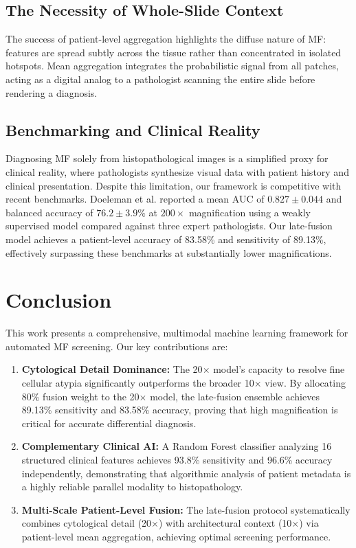 \documentclass[conference]{IEEEtran}
\begin{document}
\subsection{The Necessity of Whole-Slide Context}
The success of patient-level aggregation highlights the diffuse nature of MF: features are spread subtly across the tissue rather than concentrated in isolated hotspots. Mean aggregation integrates the probabilistic signal from all patches, acting as a digital analog to a pathologist scanning the entire slide before rendering a diagnosis.

\subsection{Benchmarking and Clinical Reality}
Diagnosing MF solely from histopathological images is a simplified proxy for clinical reality, where pathologists synthesize visual data with patient history and clinical presentation. Despite this limitation, our framework is competitive with recent benchmarks. Doeleman et al. \cite{Doeleman2024-MF} reported a mean AUC of $0.827 \pm 0.044$ and balanced accuracy of $76.2 \pm 3.9\%$ at $200\times$ magnification using a weakly supervised model compared against three expert pathologists. Our late-fusion model achieves a patient-level accuracy of 83.58\% and sensitivity of 89.13\%, effectively surpassing these benchmarks at substantially lower magnifications.
\section{Conclusion}
This work presents a comprehensive, multimodal machine learning framework for automated MF screening. Our key contributions are:
\begin{enumerate}
    \item \textbf{Cytological Detail Dominance:} The 20$\times$ model's capacity to resolve fine cellular atypia significantly outperforms the broader 10$\times$ view. By allocating 80\% fusion weight to the 20$\times$ model, the late-fusion ensemble achieves 89.13\% sensitivity and 83.58\% accuracy, proving that high magnification is critical for accurate differential diagnosis.
    \item \textbf{Complementary Clinical AI:} A Random Forest classifier analyzing 16 structured clinical features achieves 93.8\% sensitivity and 96.6\% accuracy independently, demonstrating that algorithmic analysis of patient metadata is a highly reliable parallel modality to histopathology.
    \item \textbf{Multi-Scale Patient-Level Fusion:} The late-fusion protocol systematically combines cytological detail (20$\times$) with architectural context (10$\times$) via patient-level mean aggregation, achieving optimal screening performance.
\end{enumerate}
\end{document}
